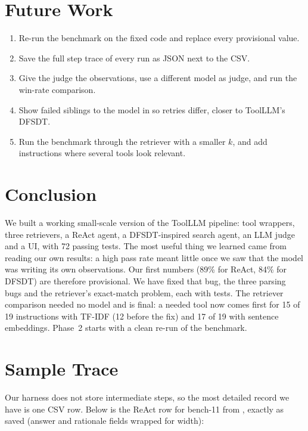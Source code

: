 \documentclass[conference,a4paper]{IEEEtran}
\newcommand{\prov}{provisional}
\begin{document}
\section{Future Work}
\begin{enumerate}
  \item Re-run the benchmark on the fixed code and replace every
        \prov{} value.
  \item Save the full step trace of every run as JSON next to the CSV.
  \item Give the judge the observations, use a different model as judge,
        and run the win-rate comparison.
  \item Show failed siblings to the model in  so retries
        differ, closer to ToolLLM's DFSDT.
  \item Run the benchmark through the retriever with a smaller $k$, and
        add instructions where several tools look relevant.
\end{enumerate}

\section{Conclusion}
We built a working small-scale version of the ToolLLM pipeline: tool
wrappers, three retrievers, a ReAct agent, a DFSDT-inspired search agent,
an LLM judge and a UI, with 72 passing tests. The most useful thing we
learned came from reading our own results: a high pass rate meant little
once we saw that the model was writing its own observations. Our first
numbers (89\% for ReAct, 84\% for DFSDT) are therefore \prov{}. We have
fixed that bug, the three parsing bugs and the retriever's exact-match
problem, each with tests. The retriever comparison needed no model and is
final: a needed tool now comes first for 15 of 19 instructions with
TF-IDF (12 before the fix) and 17 of 19 with sentence embeddings. Phase~2
starts with a clean re-run of the benchmark.


{\raggedright

}

\appendices
\section{Sample Trace}
Our harness does not store intermediate steps, so the most detailed
record we have is one CSV row. Below is the ReAct row for bench-11 from
, exactly as saved (answer and
rationale fields wrapped for width):
\end{document}
